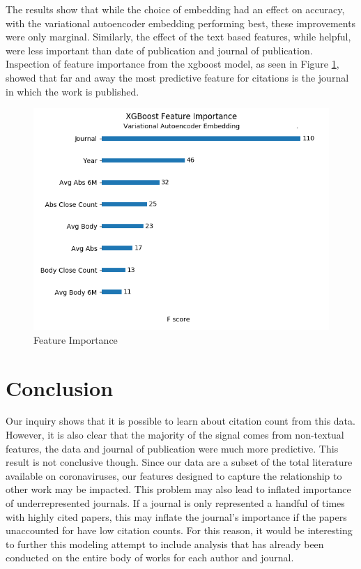 \documentclass{article} %
\begin{document}
The results show that while the choice of embedding had an effect on accuracy, with the variational autoencoder embedding performing best, these improvements were only marginal. Similarly, the effect of the text based features, while helpful, were less important than date of publication and journal of publication. Inspection of feature importance from the xgboost model, as seen in Figure \ref{feature_imp}, showed that far and away the most predictive feature for citations is the journal in which the work is published.


\begin{figure}[h]
\begin{center}
  \includegraphics[scale=0.5]{../Figures/xgboost_feature_importance.png}
\end{center}
\caption{Feature Importance}
\label{feature_imp}
\end{figure}


\section{Conclusion}
\label{conclusion}

Our inquiry shows that it is possible to learn about citation count from this data. However, it is also  clear that the majority of the signal comes from non-textual features, the data and journal of publication were much more predictive. This result is not conclusive though. Since our data are a subset of the total literature available on coronaviruses, our features designed to capture the relationship to other work may be impacted. This problem may also lead to inflated importance of underrepresented journals. If a journal is only represented a handful of times with highly cited papers, this may inflate the journal's importance if the papers unaccounted for have low citation counts. For this reason, it would be interesting to further this modeling attempt to include analysis that has already been conducted on the entire body of works for each author and journal.  
\end{document}
